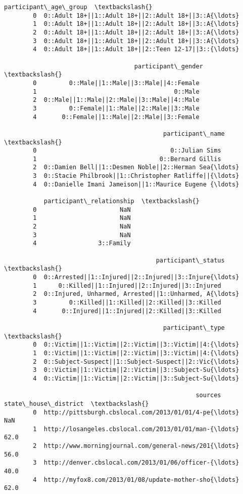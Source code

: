 \documentclass[11pt]{article}
\begin{document}
\begin{Verbatim}[commandchars=\\\{\}]
                                       participant\_age\_group  \textbackslash{}
        0  0::Adult 18+||1::Adult 18+||2::Adult 18+||3::A{\ldots}   
        1  0::Adult 18+||1::Adult 18+||2::Adult 18+||3::A{\ldots}   
        2  0::Adult 18+||1::Adult 18+||2::Adult 18+||3::A{\ldots}   
        3  0::Adult 18+||1::Adult 18+||2::Adult 18+||3::A{\ldots}   
        4  0::Adult 18+||1::Adult 18+||2::Teen 12-17||3::{\ldots}   
        
                                    participant\_gender  \textbackslash{}
        0         0::Male||1::Male||3::Male||4::Female   
        1                                      0::Male   
        2  0::Male||1::Male||2::Male||3::Male||4::Male   
        3         0::Female||1::Male||2::Male||3::Male   
        4       0::Female||1::Male||2::Male||3::Female   
        
                                            participant\_name  \textbackslash{}
        0                                     0::Julian Sims   
        1                                  0::Bernard Gillis   
        2  0::Damien Bell||1::Desmen Noble||2::Herman Sea{\ldots}   
        3  0::Stacie Philbrook||1::Christopher Ratliffe||{\ldots}   
        4  0::Danielle Imani Jameison||1::Maurice Eugene {\ldots}   
        
           participant\_relationship  \textbackslash{}
        0                       NaN   
        1                       NaN   
        2                       NaN   
        3                       NaN   
        4                 3::Family   
        
                                          participant\_status  \textbackslash{}
        0  0::Arrested||1::Injured||2::Injured||3::Injure{\ldots}   
        1      0::Killed||1::Injured||2::Injured||3::Injured   
        2  0::Injured, Unharmed, Arrested||1::Unharmed, A{\ldots}   
        3         0::Killed||1::Killed||2::Killed||3::Killed   
        4       0::Injured||1::Injured||2::Killed||3::Killed   
        
                                            participant\_type  \textbackslash{}
        0  0::Victim||1::Victim||2::Victim||3::Victim||4:{\ldots}   
        1  0::Victim||1::Victim||2::Victim||3::Victim||4:{\ldots}   
        2  0::Subject-Suspect||1::Subject-Suspect||2::Vic{\ldots}   
        3  0::Victim||1::Victim||2::Victim||3::Subject-Su{\ldots}   
        4  0::Victim||1::Victim||2::Victim||3::Subject-Su{\ldots}   
        
                                                     sources state\_house\_district  \textbackslash{}
        0  http://pittsburgh.cbslocal.com/2013/01/01/4-pe{\ldots}                  NaN   
        1  http://losangeles.cbslocal.com/2013/01/01/man-{\ldots}                 62.0   
        2  http://www.morningjournal.com/general-news/201{\ldots}                 56.0   
        3  http://denver.cbslocal.com/2013/01/06/officer-{\ldots}                 40.0   
        4  http://myfox8.com/2013/01/08/update-mother-sho{\ldots}                 62.0   
        

\end{Verbatim}
\end{document}
